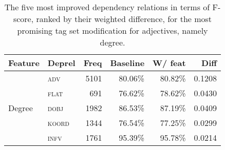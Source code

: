 \documentclass[a4paper,12pt,english]{book}
\begin{document}
\begin{table}
    \vspace{1ex}
    \centering
    \smaller[0.5]
    \begin{tabular}{@{}llrrrr@{}}
        \toprule
        \textbf{Feature} & \textbf{Deprel} & \textbf{Freq} &
        \textbf{Baseline} & \textbf{W/ feat} & \textbf{Diff} \\
        \midrule
        \multirow{5}{*}{Degree}
        & \textsc{adv} & 5101 & 80.06\% & 80.82\% & 0.1208 \\
        & \textsc{flat} & 691 & 76.62\% & 78.62\% & 0.0430 \\
        & \textsc{dobj} & 1982 & 86.53\% & 87.19\% & 0.0409 \\
        & \textsc{koord} & 1344 & 76.54\% & 77.25\% & 0.0299 \\
        & \textsc{infv} & 1761 & 95.39\% & 95.78\% & 0.0214 \\
        \bottomrule
    \end{tabular}
    \caption{The five most improved dependency relations in terms of F-score,
        ranked by their weighted difference, for the most promising tag set
        modification for adjectives, namely degree.}
    \label{adjparseerror}
\end{table}
\end{document}
